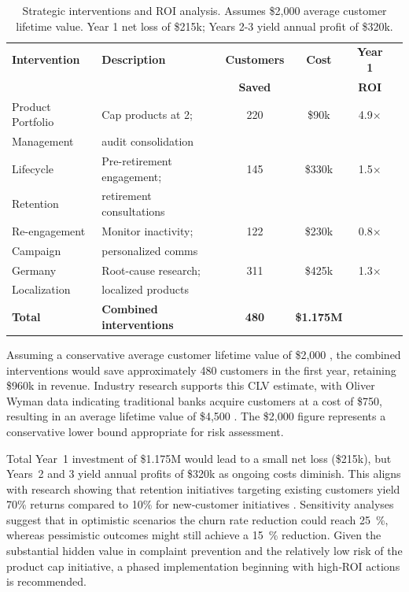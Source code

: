 \documentclass[12pt]{article}
\begin{document}
\begin{table}[H]
\centering
\small
\caption{Strategic interventions and ROI analysis. Assumes \$2,000 average customer lifetime value. Year 1 net loss of \$215k; Years 2-3 yield annual profit of \$320k.}
\label{tab:roi_analysis}
\begin{tabular}{lp{4cm}cccc}
\toprule
\textbf{Intervention} & \textbf{Description} & \textbf{Customers} & \textbf{Cost} & \textbf{Year 1} \\
& & \textbf{Saved} & & \textbf{ROI} \\
\midrule
Product Portfolio & Cap products at 2; & 220 & \$90k & 4.9× \\
Management & audit consolidation & & & \\
\midrule
Lifecycle & Pre-retirement engagement; & 145 & \$330k & 1.5× \\
Retention & retirement consultations & & & \\
\midrule
Re-engagement & Monitor inactivity; & 122 & \$230k & 0.8× \\
Campaign & personalized comms & & & \\
\midrule
Germany & Root-cause research; & 311 & \$425k & 1.3× \\
Localization & localized products & & & \\
\midrule
\textbf{Total} & \textbf{Combined interventions} & \textbf{480} & \textbf{\$1.175M} & \\
\bottomrule
\end{tabular}
\end{table}

Assuming a conservative average customer lifetime value of \$2,000 \citep{meleis2010clv}, the combined interventions would save approximately 480 customers in the first year, retaining \$960k in revenue.  Industry research supports this CLV estimate, with Oliver Wyman data indicating traditional banks acquire customers at a cost of \$750, resulting in an average lifetime value of \$4,500 \citep{chowdhry2019chime}.  The \$2,000 figure represents a conservative lower bound appropriate for risk assessment.

Total Year~1 investment of \$1.175M would lead to a small net loss (\$215k), but Years~2 and 3 yield annual profits of \$320k as ongoing costs diminish.  This aligns with research showing that retention initiatives targeting existing customers yield 70\% returns compared to 10\% for new‑customer initiatives \citep{browning2024retention}.  Sensitivity analyses suggest that in optimistic scenarios the churn rate reduction could reach 25~\%, whereas pessimistic outcomes might still achieve a 15~\% reduction.  Given the substantial hidden value in complaint prevention and the relatively low risk of the product cap initiative, a phased implementation beginning with high‑ROI actions is recommended.
\end{document}
